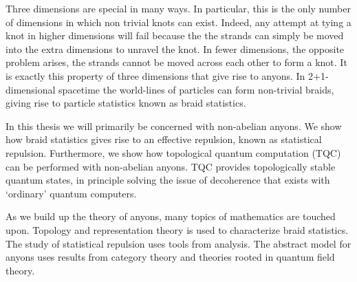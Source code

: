 \documentclass[a4paper,10pt,oneside]{book}
\theoremstyle{plain}
\theoremstyle{definition}
\theoremstyle{remark}
\begin{document}
Three dimensions are special in many ways. In particular, this is the only number of dimensions in which non trivial knots can exist. Indeed, any attempt at tying a knot in higher dimensions will fail because the the strands can simply be moved into the extra dimensions to unravel the knot. In fewer dimensions, the opposite problem arises, the strands cannot be moved across each other to form a knot. It is exactly this property of three dimensions that give rise to anyons. In 2+1-dimensional spacetime the world-lines of particles can form non-trivial braids, giving rise to particle statistics known as braid statistics.

In this thesis we will primarily be concerned with non-abelian anyons. We show how braid statistics gives rise to an effective repulsion, known as statistical repulsion. Furthermore, we show how topological quantum computation (TQC) can be performed with non-abelian anyons. TQC provides topologically stable quantum states, in principle solving the issue of decoherence that exists with `ordinary' quantum computers.

As we build up the theory of anyons, many topics of mathematics are touched upon. Topology and representation theory is used to characterize braid statistics. The study of statistical repulsion uses tools from analysis. The abstract model for anyons uses results from category theory and theories rooted in quantum field theory.





\end{document}
